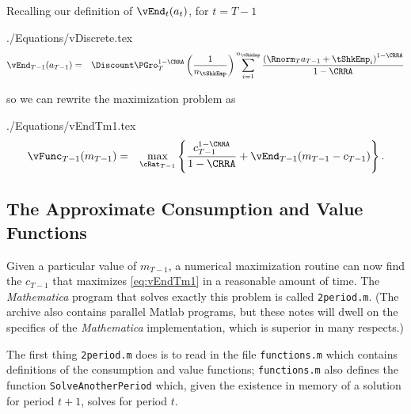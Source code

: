 \documentclass[titlepage]{\econtex}
\newcommand{\Mma}{\textit{Mathematica}}
\begin{document}
Recalling our definition of ${\vEnd}_{t}({a}_{t})$, for $t=T-1$
\begin{verbatimwrite}{./Equations/vDiscrete.tex}
  \begin{eqnarray}
    \vEnd_{T-1}({a}_{T-1}) & = &   \Discount \PGro_{T}^{1-\CRRA}\left(\frac{1}{n_{\tShkEmp}}\right)\sum_{i=1}^{n_{\tShkEmp}}   \frac{\left( \Rnorm_{T} {a}_{T-1} + \tShkEmp_{i}\right)^{1-\CRRA}}{1-\CRRA} \label{eq:vDiscrete}
  \end{eqnarray}
\end{verbatimwrite}

so we can rewrite the maximization problem as 
\begin{verbatimwrite}{./Equations/vEndTm1.tex}
  \begin{eqnarray}
    {\vFunc}_{T-1}({m}_{T-1})  & = & \max_{\cRat_{T-1}}
                                     \left\{
                                     \frac{{c}_{T-1}^{1-\CRRA}}{1-\CRRA} +
                                     \vEnd_{T-1}({m}_{T-1}-{c}_{T-1})
                                     \right\}.
                                     \label{eq:vEndTm1}
  \end{eqnarray}
\end{verbatimwrite}


\subsection{The Approximate Consumption and Value Functions}

Given a particular value of ${m}_{T-1}$, a numerical maximization
routine can now find the ${c}_{T-1}$ that maximizes
\eqref{eq:vEndTm1} in a reasonable amount of time.  The {\Mma} program that
solves exactly this problem is called \texttt{2period.m}.  (The archive also contains
parallel Matlab programs, but these notes will dwell on the specifics of the
{\Mma} implementation, which is superior in many respects.)

The first thing \texttt{2period.m} does is to read in the file
\texttt{functions.m} which contains definitions of the consumption and
value functions; \texttt{functions.m} also defines the function \texttt{SolveAnotherPeriod}
which, given the existence in memory of a solution for period $t+1$,
solves for period $t$.
\end{document}
